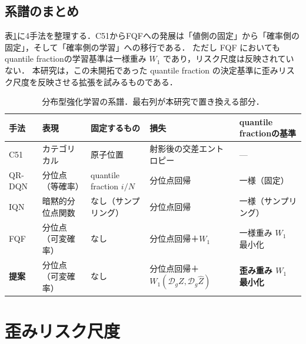 \documentclass[a4paper,10pt]{jsarticle}
\theoremstyle{definition}
\newcommand{\Wone}{W_1}
\newcommand{\dist}{\mathcal{D}_g}
\begin{document}
\subsection{系譜のまとめ}
表\ref{tab:lineage}に4手法を整理する．C51からFQFへの発展は「値側の固定」から「確率側の固定」，そして「確率側の学習」への移行である．
ただし FQF においてもquantile fractionの学習基準は一様重み $\Wone$ であり，リスク尺度は反映されていない．
本研究は，この未開拓であった quantile fraction の決定基準に歪みリスク尺度を反映させる拡張を試みるものである．

\begin{table}[htbp]
\centering
\caption{分布型強化学習の系譜．最右列が本研究で置き換える部分．}
\label{tab:lineage}
\small
\setlength{\tabcolsep}{2.5pt}
\begin{tabular}{lllll}
\toprule
手法 & 表現 & 固定するもの & 損失 & quantile fractionの基準\\
\midrule
C51 \cite{bellemare2017c51} & カテゴリカル & 原子位置 & 射影後の交差エントロピー & ---\\
QR-DQN \cite{dabney2018qrdqn} & 分位点（等確率） & quantile fraction $i/N$ & 分位点回帰 & 一様（固定）\\
IQN \cite{dabney2018iqn} & 暗黙的分位点関数 & なし（サンプリング） & 分位点回帰 & 一様（サンプリング）\\
FQF \cite{yang2019fqf} & 分位点（可変確率） & なし & 分位点回帰＋$\Wone$ & 一様重み $\Wone$ 最小化\\
\textbf{提案} & 分位点（可変確率） & なし & 分位点回帰＋$\Wone(\dist Z,\dist\hat Z)$ & \textbf{歪み重み $\Wone$ 最小化}\\
\bottomrule
\end{tabular}
\end{table}

\section{歪みリスク尺度}
\label{sec:drm}
\end{document}
